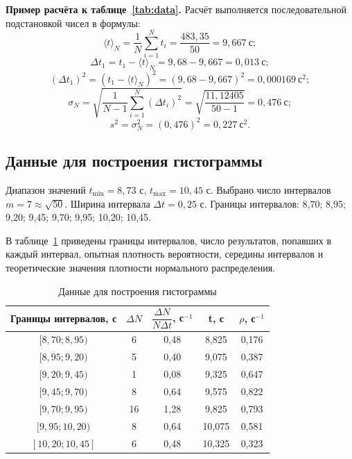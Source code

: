 \documentclass[a4paper,14pt]{extarticle}
\begin{document}
	\noindent\textbf{Пример расчёта к таблице~\ref{tab:data}.}
	Расчёт выполняется последовательной подстановкой чисел в формулы:
	\[
	\langle t \rangle_N = \frac{1}{N}\sum_{i=1}^{N}t_i
	= \frac{483{,}35}{50} = 9{,}667\ \text{с};
	\]
	\[
	\Delta t_1 = t_1-\langle t \rangle_N
	= 9{,}68-9{,}667 = 0{,}013\ \text{с};
	\]
	\[
	(\Delta t_1)^2 = \left(t_1-\langle t \rangle_N\right)^2
	= (9{,}68-9{,}667)^2 = 0{,}000169\ \text{с}^2;
	\]
	\[
	\sigma_N = \sqrt{\frac{1}{N-1}\sum_{i=1}^{N}(\Delta t_i)^2}
	= \sqrt{\frac{11{,}12405}{50-1}} = 0{,}476\ \text{с};
	\]
	\[
	s^2 = \sigma_N^2 = (0{,}476)^2 = 0{,}227\ \text{с}^2.
	\]

	\clearpage
	\subsection{Данные для построения гистограммы}
	
	Диапазон значений \(t_{\min} = 8{,}73\) с, \(t_{\max} = 10{,}45\) с.  
	Выбрано число интервалов \(m = 7 \approx \sqrt{50}\).  
	Ширина интервала \(\Delta t = 0{,}25\) с.  
	Границы интервалов: 8,70; 8,95; 9,20; 9,45; 9,70; 9,95; 10,20; 10,45.
	
	В таблице~\ref{tab:hist} приведены границы интервалов, число результатов, попавших в каждый интервал, опытная плотность вероятности, середины интервалов и теоретические значения плотности нормального распределения.
	
	\begingroup
	\renewcommand{\arraystretch}{1.6}
	\begin{table}[h!]
		\centering
		\caption{Данные для построения гистограммы}
		\label{tab:hist}
		\begin{tabular}{|c|c|c|c|c|}
			\hline
			Границы интервалов, с & $\Delta N$ & $\dfrac{\Delta N}{N \Delta t}$, с$^{-1}$ & t, с & $\rho$, с$^{-1}$ \\ \hline
			$[8{,}70; 8{,}95)$ & 6  & 0,48 & 8,825 & 0,176 \\ \hline
			$[8{,}95; 9{,}20)$ & 5  & 0,40 & 9,075 & 0,387 \\ \hline
			$[9{,}20; 9{,}45)$ & 1  & 0,08 & 9,325 & 0,647 \\ \hline
			$[9{,}45; 9{,}70)$ & 8  & 0,64 & 9,575 & 0,822 \\ \hline
			$[9{,}70; 9{,}95)$ & 16 & 1,28 & 9,825 & 0,793 \\ \hline
			$[9{,}95; 10{,}20)$& 8  & 0,64 & 10,075& 0,581 \\ \hline
			$[10{,}20; 10{,}45]$& 6  & 0,48 & 10,325& 0,323 \\ \hline
		\end{tabular}
	\end{table}
	\endgroup
\end{document}
